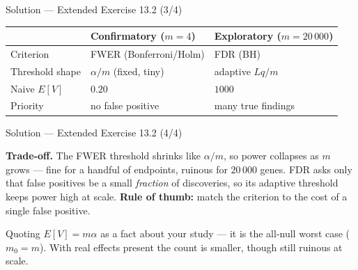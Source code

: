 \documentclass[aspectratio=169,11pt]{beamer}
\begin{document}
\begin{frame}{Solution --- Extended Exercise 13.2 (3/4)}
\begin{solutionbox}
  \begin{center}\footnotesize
  \begin{tabular}{lll}
    \toprule
     & Confirmatory ($m=4$) & Exploratory ($m=20\,000$) \\
    \midrule
    Criterion       & FWER (Bonferroni/Holm) & FDR (BH) \\
    Threshold shape & $\alpha/m$ (fixed, tiny) & adaptive $Lq/m$ \\
    Naive $E[V]$    & $0.20$ & $1000$ \\
    Priority        & no false positive & many true findings \\
    \bottomrule
  \end{tabular}
  \end{center}
  \end{solutionbox}
\end{frame}

\begin{frame}{Solution --- Extended Exercise 13.2 (4/4)}
  \begin{solutionbox}
  \textbf{Trade-off.} The FWER threshold shrinks like $\alpha/m$, so power collapses as
  $m$ grows --- fine for a handful of endpoints, ruinous for $20\,000$ genes. FDR asks
  only that false positives be a small \emph{fraction} of discoveries, so its adaptive
  threshold keeps power high at scale. \textbf{Rule of thumb:} match the criterion to the
  cost of a single false positive.

\end{solutionbox}
\begin{mistake}
  Quoting $E[V]=m\alpha$ as a fact about your study --- it is the all-null worst
  case ($m_0=m$). With real effects present the count is smaller, though still
  ruinous at scale.
\end{mistake}
\end{frame}
\end{document}

